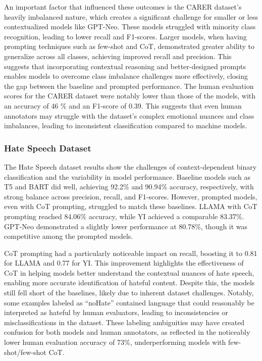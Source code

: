 \documentclass[twocolumn]{article}
\begin{document}
An important factor that influenced these outcomes is the CARER dataset’s heavily imbalanced nature, which creates a significant challenge for smaller or less contextualized models like GPT-Neo. These models struggled with minority class recognition, leading to lower recall and F1-scores. Larger models, when having prompting techniques such as few-shot and CoT, demonstrated greater ability to generalize across all classes, achieving improved recall and precision. This suggests that incorporating contextual reasoning and better-designed prompts enables models to overcome class imbalance challenges more effectively, closing the gap between the baseline and prompted performance. The human evaluation scores for the CARER dataset were notably lower than those of the models, with an accuracy of 46
\% and an F1-score of 0.39. This suggests that even human annotators may struggle with the dataset's complex emotional nuances and class imbalances, leading to inconsistent classification compared to machine models. 

\subsubsection{Hate Speech Dataset}

The Hate Speech dataset results show the challenges of context-dependent binary classification and the variability in model performance. Baseline models such as T5 and BART did well, achieving 92.2\% and 90.94\% accuracy, respectively, with strong balance across precision, recall, and F1-scores. However, prompted models, even with CoT prompting, struggled to match these baselines. LLAMA with CoT prompting reached 84.06\% accuracy, while YI achieved a comparable 83.37\%. GPT-Neo demonstrated a slightly lower performance at 80.78\%, though it was competitive among the prompted models.

CoT prompting had a particularly noticeable impact on recall, boosting it to 0.81 for LLAMA and 0.77 for YI. This improvement highlights the effectiveness of CoT in helping models better understand the contextual nuances of hate speech, enabling more accurate identification of hateful content. Despite this, the models still fell short of the baselines, likely due to inherent dataset challenges. Notably, some examples labeled as “noHate” contained language that could reasonably be interpreted as hateful by human evaluators, leading to inconsistencies or misclassifications in the dataset. These labeling ambiguities may have created confusion for both models and human annotators, as reflected in the noticeably lower human evaluation accuracy of 73\%, underperforming models with few-shot/few-shot CoT.
\end{document}
